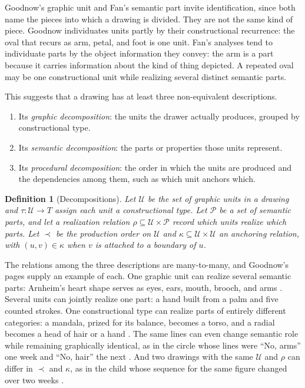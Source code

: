 \documentclass[11pt]{article}
\newtheorem{definition}{Definition}
\theoremstyle{remark}
\newcommand{\U}{\mathcal{U}}
\newcommand{\Pset}{\mathcal{P}}
\begin{document}
Goodnow's graphic unit and Fan's semantic part invite identification, since both name the pieces into which a drawing is divided. They are not the same kind of piece. Goodnow individuates units partly by their constructional recurrence: the oval that recurs as arm, petal, and foot is one unit. Fan's analyses tend to individuate parts by the object information they convey: the arm is a part because it carries information about the kind of thing depicted. A repeated oval may be one constructional unit while realizing several distinct semantic parts.

This suggests that a drawing has at least three non-equivalent descriptions.

\begin{enumerate}[leftmargin=2em]
\item Its \emph{graphic decomposition}: the units the drawer actually produces, grouped by constructional type.
\item Its \emph{semantic decomposition}: the parts or properties those units represent.
\item Its \emph{procedural decomposition}: the order in which the units are produced and the dependencies among them, such as which unit anchors which.
\end{enumerate}

\begin{definition}[Decompositions]
Let $\U$ be the set of graphic units in a drawing and $\tau : \U \to T$ assign each unit a constructional type. Let $\Pset$ be a set of semantic parts, and let a \emph{realization relation} $\rho \subseteq \U \times \Pset$ record which units realize which parts. Let $\prec$ be the production order on $\U$ and $\kappa \subseteq \U \times \U$ an anchoring relation, with $(u,v) \in \kappa$ when $v$ is attached to a boundary of $u$.
\end{definition}

The relations among the three descriptions are many-to-many, and Goodnow's pages supply an example of each. One graphic unit can realize several semantic parts: Arnheim's heart shape serves as eyes, ears, mouth, brooch, and arms \cite[p.~35]{goodnow1977}. Several units can jointly realize one part: a hand built from a palm and five counted strokes. One constructional type can realize parts of entirely different categories: a mandala, prized for its balance, becomes a torso, and a radial becomes a head of hair or a hand \cite[p.~36]{goodnow1977}. The same lines can even change semantic role while remaining graphically identical, as in the circle whose lines were ``No, arms'' one week and ``No, hair'' the next \cite[p.~50]{goodnow1977}. And two drawings with the same $\U$ and $\rho$ can differ in $\prec$ and $\kappa$, as in the child whose sequence for the same figure changed over two weeks \cite[p.~23]{goodnow1977}.
\end{document}

